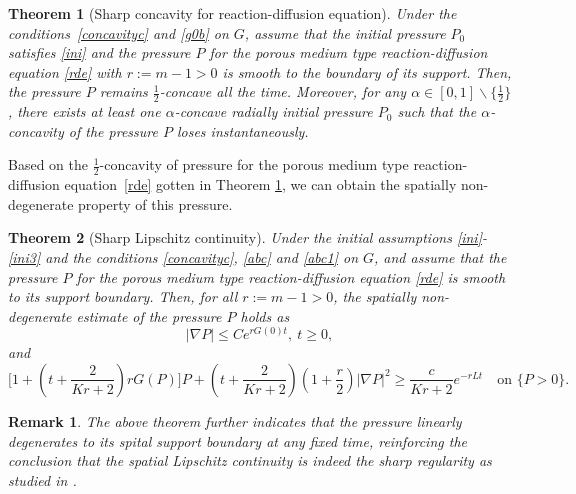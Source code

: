 \documentclass[10pt]{article}         %
\newtheorem{theorem}{Theorem}[section]
\newtheorem{remark}{Remark}[section]
\numberwithin{equation}{section}
\begin{document}
\begin{theorem}[Sharp concavity for reaction-diffusion equation]\label{concavityrde}Under the conditions~\eqref{concavityc} and \eqref{g0b} on $G$, assume that the initial pressure $P_0$ satisfies \eqref{ini} and the pressure $P$ for the porous medium type reaction-diffusion equation \eqref{rde} with  $r:=m-1>0$ is smooth to the boundary of its support. Then, the pressure $P$  remains $\frac{1}{2}$-concave all the time. Moreover, for any $\alpha\in [0,1]\backslash\{\frac{1}{2}\}$, there exists at least one $\alpha$-concave radially initial  pressure $P_0$ such that the $\alpha$-concavity of the pressure $P$ loses instantaneously.
\end{theorem}

Based on the $\frac{1}{2}$-concavity of pressure for the porous medium type reaction-diffusion equation~\eqref{rde} gotten in Theorem \ref{concavityrde}, we can obtain the spatially non-degenerate property of this pressure. %
\begin{theorem}[Sharp Lipschitz continuity]\label{slc} %
Under the initial assumptions \eqref{ini}-\eqref{ini3} and the conditions \eqref{concavityc}, \eqref{abc} and \eqref{abc1} on $G$, and assume that the  pressure $P$ for the porous medium type reaction-diffusion equation \eqref{rde} is smooth to its support boundary. Then, for all $r:=m-1>0$, the spatially non-degenerate estimate of the pressure $P$ holds as
\[|\nabla P|\leq Ce^{rG(0)t},\ t\geq 0,\]
and
\[\big[1+(t+\frac{2}{Kr+2})rG(P)\big]P+(t+\frac{2}{Kr+2})(1+\frac{r}{2})|\nabla P|^2\geq \frac{c}{Kr+2}e^{-rLt}\quad \text{on }\{P>0\}.\]
\end{theorem}

\begin{remark}
The above theorem further indicates that the pressure linearly degenerates to its spital support boundary at any fixed time, reinforcing the conclusion that the spatial Lipschitz continuity is indeed the sharp regularity as studied in \cite{HQ2024}.
\end{remark}
\end{document}

